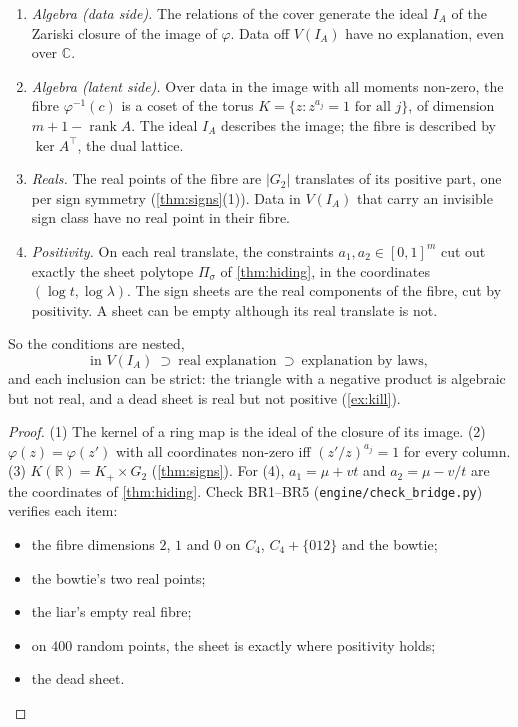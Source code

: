 \documentclass[11pt]{article}
\theoremstyle{definition}\newtheorem{definition}[theorem]{Definition}\newtheorem{remark}[theorem]{Remark}\newtheorem{example}[theorem]{Example}
\begin{document}
\begin{lemma}\label{lem:bridge}
\begin{enumerate}
\item[(1)] \emph{Algebra (data side).} The relations of the cover generate the ideal $I_A$ of the Zariski closure of the image of $\varphi$.
  Data off $V(I_A)$ have no explanation, even over $\mathbb C$.
\item[(2)] \emph{Algebra (latent side).} Over data in the image with all moments non-zero, the fibre $\varphi^{-1}(c)$ is a coset of the
  torus $K=\{z:z^{a_j}=1\text{ for all }j\}$, of dimension $m+1-\operatorname{rank}A$. The ideal $I_A$ describes the image; the fibre is
  described by $\ker A^\top$, the dual lattice.
\item[(3)] \emph{Reals.} The real points of the fibre are $|G_2|$ translates of its positive part, one per sign symmetry
  (\cref{thm:signs}(1)). Data in $V(I_A)$ that carry an invisible sign class have no real point in their fibre.
\item[(4)] \emph{Positivity.} On each real translate, the constraints $a_1,a_2\in[0,1]^m$ cut out exactly the sheet polytope $\Pi_\sigma$
  of \cref{thm:hiding}, in the coordinates $(\log t,\log\lambda)$. The sign sheets are the real components of the fibre, cut by
  positivity. A sheet can be empty although its real translate is not.
\end{enumerate}
So the conditions are nested,
\[
\text{in }V(I_A)\ \supset\ \text{real explanation}\ \supset\ \text{explanation by laws},
\]
and each inclusion can be strict: the triangle with a negative product is algebraic but not real, and a dead sheet is real but not
positive (\cref{ex:kill}).
\end{lemma}

\begin{proof}
(1) The kernel of a ring map is the ideal of the closure of its image. (2) $\varphi(z)=\varphi(z')$ with all coordinates non-zero iff
$(z'/z)^{a_j}=1$ for every column. (3) $K(\mathbb R)=K_+\times G_2$ (\cref{thm:signs}). For (4), $a_1=\mu+vt$ and $a_2=\mu-v/t$ are
the coordinates of \cref{thm:hiding}. Check BR1--BR5 (\texttt{engine/check\_bridge.py}) verifies each item:
\begin{itemize}
\item the fibre dimensions $2$, $1$ and $0$ on $C_4$, $C_4+\{012\}$ and the bowtie;
\item the bowtie's two real points;
\item the liar's empty real fibre;
\item on $400$ random points, the sheet is exactly where positivity holds;
\item the dead sheet.
\end{itemize}
\end{proof}
\end{document}
